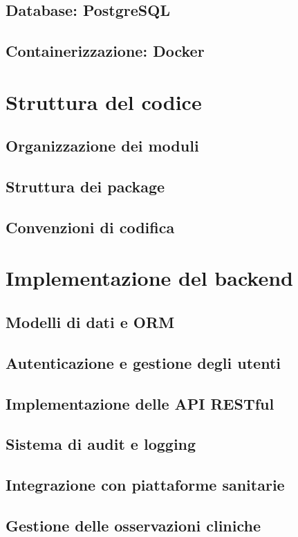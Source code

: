 \documentclass[12pt,a4paper,oneside]{report}
\begin{document}
\subsection{Database: PostgreSQL}
\subsection{Containerizzazione: Docker}

\section{Struttura del codice}
\subsection{Organizzazione dei moduli}
\subsection{Struttura dei package}
\subsection{Convenzioni di codifica}

\section{Implementazione del backend}
\subsection{Modelli di dati e ORM}
\subsection{Autenticazione e gestione degli utenti}
\subsection{Implementazione delle API RESTful}
\subsection{Sistema di audit e logging}
\subsection{Integrazione con piattaforme sanitarie}
\subsection{Gestione delle osservazioni cliniche}
\end{document}
